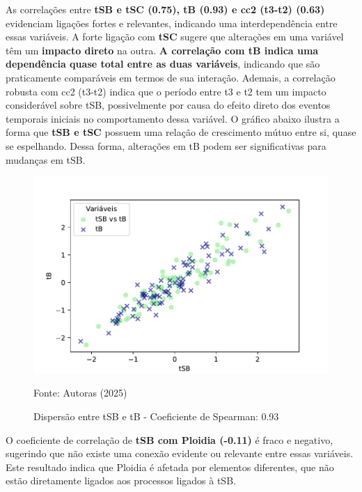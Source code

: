 As correlações entre \textbf{tSB e tSC (0.75), tB (0.93) e cc2 (t3-t2) (0.63)} evidenciam ligações fortes e relevantes, indicando uma interdependência entre essas variáveis. A forte ligação com \textbf{tSC} sugere que alterações em uma variável têm um \textbf{impacto direto} na outra. \textbf{A correlação com tB indica uma dependência quase total entre as duas variáveis}, indicando que são praticamente comparáveis em termos de sua interação. Ademais, a correlação robusta com cc2 (t3-t2) indica que o período entre t3 e t2 tem um impacto considerável sobre tSB, possivelmente por causa do efeito direto dos eventos temporais iniciais no comportamento dessa variável. O gráfico abaixo ilustra a forma que \textbf{tSB e tSC} possuem uma relação de crescimento mútuo entre si, quase se espelhando. Dessa forma, alterações em tB podem ser significativas para mudanças em tSB.

\begin{figure}[h]
    \captionsetup{font=footnotesize, justification=centering, labelsep=period, position=above}
    \caption{Dispersão entre tSB e tB - Coeficiente de Spearman: 0.93}
    \label{fig:tSB-tB}
    \centering
    \includegraphics[scale=0.5]{figuras/Spearman/tSB-tB.pdf}
    \vspace{0.3cm} 
    \begin{minipage}{\linewidth}
        \centering
        \scriptsize{Fonte: Autoras (2025)}
    \end{minipage}
\end{figure}
\FloatBarrier

O coeficiente de correlação de \textbf{tSB com Ploidia (-0.11)} é fraco e negativo, sugerindo que não existe uma conexão evidente ou relevante entre essas variáveis. Este resultado indica que Ploidia é afetada por elementos diferentes, que não estão diretamente ligados aos processos ligados à tSB.

